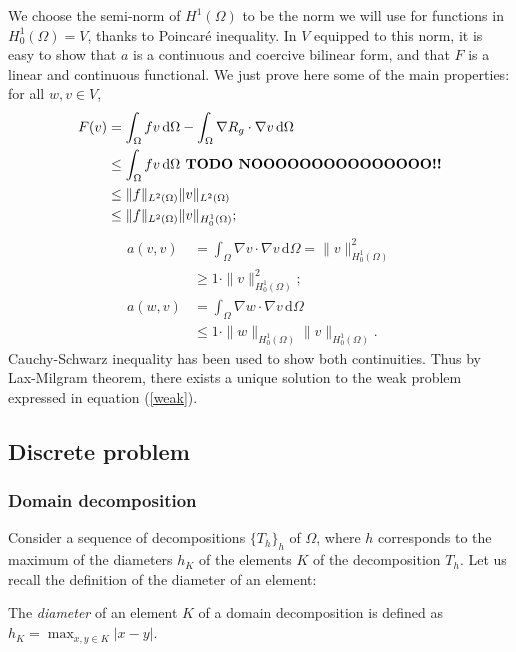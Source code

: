 We choose the semi-norm of $H^1(\Omega)$ to be the norm we will use for functions in $H^1_0(\Omega) = V$, thanks to Poincaré inequality. In $V$ equipped to this norm, it is easy to show that $a$ is a continuous and coercive bilinear form, and that $F$ is a linear and continuous functional. We just prove here some of the main properties: for all $w,v\in V$, 
\begin{align*}
F(v) &= \int_\Omega fv \, \mathrm{d}\Omega -\int_\Omega \nabla R_g \cdot \nabla v \, \mathrm{d} \Omega \\
& \leq \int_\Omega fv \, \mathrm{d}\Omega \text{\textbf{ TODO NOOOOOOOOOOOOOOO!!}}\\
& \leq \|f\|_{L^2(\Omega)}\|v\|_{L^2(\Omega)}\\
& \leq \|f\|_{L^2(\Omega)}\|v\|_{H_0^1(\Omega)};
\end{align*}
\begin{align}
a(v,v) &= \int_\Omega \nabla v \cdot \nabla v \, \mathrm{d} \Omega = \|v\|^2_{H_0^1(\Omega)} \nonumber \\
& \geq 1\cdot \|v\|^2_{H_0^1(\Omega)}; \label{acoercive}\\
a(w,v) &= \int_\Omega \nabla w \cdot \nabla v \, \mathrm{d} \Omega \nonumber \\
& \leq 1 \cdot \|w\|_{H_0^1(\Omega)}\|v\|_{H_0^1(\Omega)}.\label{acontinue}
\end{align} 
Cauchy-Schwarz inequality has been used to show both continuities. Thus by Lax-Milgram theorem, there exists a unique solution to the weak problem expressed in equation (\ref{weak}). 


\subsection{Discrete problem}

\subsubsection{Domain decomposition}
Consider a sequence of decompositions $\{T_h\}_h$ of $\Omega$, where $h$ corresponds to the maximum of the diameters $h_K$ of the elements $K$ of the decomposition $T_h$. Let us recall the definition of the diameter of an element: 

\begin{definition}[Diameter]
The \textit{diameter} of an element $K$ of a domain decomposition is defined as $h_K = \max_{x,y\in K}|x-y|$. 
\end{definition}

